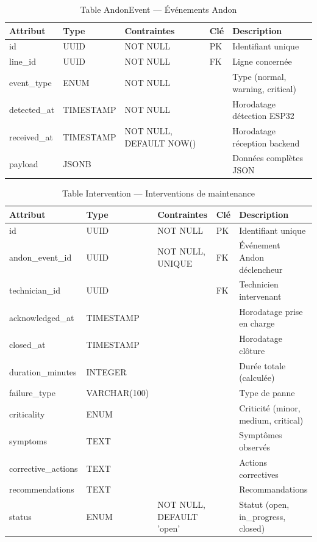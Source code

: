 \begin{table}[htbp]
\centering
\scriptsize
\caption{Table AndonEvent — Événements Andon}
\label{tab:table_event}
\begin{tabular}{|p{2.5cm}|p{2cm}|p{2cm}|p{1.5cm}|p{4cm}|}
\hline
\rowcolor{sewesblu!20}
\textbf{Attribut} & \textbf{Type} & \textbf{Contraintes} & \textbf{Clé} & \textbf{Description} \\
\hline
id & UUID & NOT NULL & PK & Identifiant unique \\
\hline
line\_id & UUID & NOT NULL & FK & Ligne concernée \\
\hline
event\_type & ENUM & NOT NULL & & Type (normal, warning, critical) \\
\hline
detected\_at & TIMESTAMP & NOT NULL & & Horodatage détection ESP32 \\
\hline
received\_at & TIMESTAMP & NOT NULL, DEFAULT NOW() & & Horodatage réception backend \\
\hline
payload & JSONB & & & Données complètes JSON \\
\hline
\end{tabular}
\end{table}


\begin{table}[htbp]
\centering
\scriptsize
\caption{Table Intervention — Interventions de maintenance}
\label{tab:table_intervention}
\begin{tabular}{|p{2.5cm}|p{2cm}|p{2cm}|p{1.5cm}|p{4cm}|}
\hline
\rowcolor{sewesblu!20}
\textbf{Attribut} & \textbf{Type} & \textbf{Contraintes} & \textbf{Clé} & \textbf{Description} \\
\hline
id & UUID & NOT NULL & PK & Identifiant unique \\
\hline
andon\_event\_id & UUID & NOT NULL, UNIQUE & FK & Événement Andon déclencheur \\
\hline
technician\_id & UUID & & FK & Technicien intervenant \\
\hline
acknowledged\_at & TIMESTAMP & & & Horodatage prise en charge \\
\hline
closed\_at & TIMESTAMP & & & Horodatage clôture \\
\hline
duration\_minutes & INTEGER & & & Durée totale (calculée) \\
\hline
failure\_type & VARCHAR(100) & & & Type de panne \\
\hline
criticality & ENUM & & & Criticité (minor, medium, critical) \\
\hline
symptoms & TEXT & & & Symptômes observés \\
\hline
corrective\_actions & TEXT & & & Actions correctives \\
\hline
recommendations & TEXT & & & Recommandations \\
\hline
status & ENUM & NOT NULL, DEFAULT 'open' & & Statut (open, in\_progress, closed) \\
\hline
\end{tabular}
\end{table}


